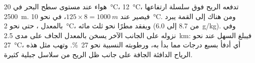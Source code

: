 \begin{example}\label{ex:g10:why-clouds-form:lee}
هواء عند مستوى سطح البحر في \qty{20}{\degreeCelsius}، 
\qty{12}{\degreeCelsius}، تدفعه الريح فوق سلسلة ارتفاعها \qty{2500}{m}. فيصير
 عند $125 \times 8 = \qty{1000}{m}$، في نحو
\qty{10}{\degreeCelsius}. ومن هناك إلى القمة يبرد بالمعدل ، حتى نحو
\qty{2}{\degreeCelsius}، ويفقد مطرًا نحو ثلث مائه (من \num{8.7} إلى
\qty{6.0}{g/kg}). وفي نزوله على الجانب الآخر يسخن بالمعدل الجاف على مدى
\qty{2.5}{km}: فيبلغ السهل عند نحو \qty{27}{\degreeCelsius}، أي أدفأ بسبع درجات
مما بدأ به، ورطوبته النسبية نحو \qty{27}{\percent}. وتهب مثل هذه الرياح الدافئة
الجافة على جانب ظل الريح من سلاسل جبلية كثيرة.
\end{example}

